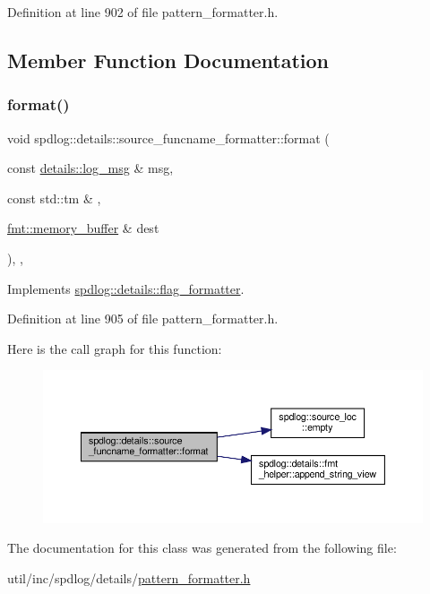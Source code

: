Definition at line 902 of file pattern\+\_\+formatter.\+h.



\subsection{Member Function Documentation}
\mbox{\label{classspdlog_1_1details_1_1source__funcname__formatter_a7628b8914c638affa0bf0fc9de62f0e4}} 
\subsubsection{\texorpdfstring{format()}{format()}}
{\footnotesize\ttfamily void spdlog\+::details\+::source\+\_\+funcname\+\_\+formatter\+::format (\begin{DoxyParamCaption}\item[{const \hyperlink{structspdlog_1_1details_1_1log__msg}{details\+::log\+\_\+msg} \&}]{msg,  }\item[{const std\+::tm \&}]{,  }\item[{\hyperlink{format_8h_a21cbf729f69302f578e6db21c5e9e0d2}{fmt\+::memory\+\_\+buffer} \&}]{dest }\end{DoxyParamCaption})\hspace{0.3cm}{\ttfamily [inline]}, {\ttfamily [override]}, {\ttfamily [virtual]}}



Implements \hyperlink{classspdlog_1_1details_1_1flag__formatter_a33fb3e42a4c8200cceb833d92b53fb67}{spdlog\+::details\+::flag\+\_\+formatter}.



Definition at line 905 of file pattern\+\_\+formatter.\+h.

Here is the call graph for this function\+:
\nopagebreak
\begin{figure}[H]
\begin{center}
\leavevmode
\includegraphics[width=350pt]{classspdlog_1_1details_1_1source__funcname__formatter_a7628b8914c638affa0bf0fc9de62f0e4_cgraph}
\end{center}
\end{figure}


The documentation for this class was generated from the following file\+:\begin{DoxyCompactItemize}
\item 
util/inc/spdlog/details/\hyperlink{pattern__formatter_8h}{pattern\+\_\+formatter.\+h}\end{DoxyCompactItemize}
